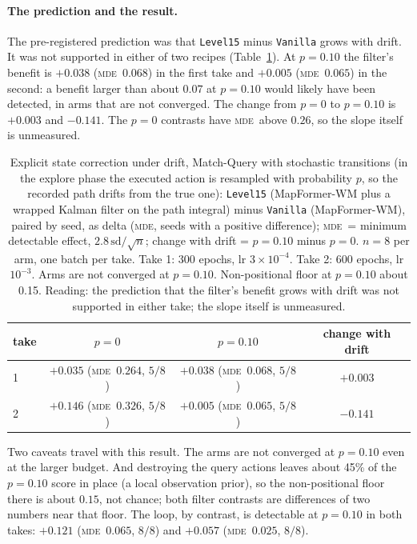 \documentclass[10pt]{article}
\newcommand{\mde}{\textsc{mde}}
\newcommand{\arm}[1]{\texttt{#1}}
\begin{document}
\paragraph{The prediction and the result.} The pre-registered prediction was that \arm{Level15} minus
\arm{Vanilla} grows with drift. It was not supported in either of two recipes (Table~\ref{tab:mqnoise}). At $p=0.10$
the filter's benefit is $+0.038$ (\mde\ $0.068$) in the first take and $+0.005$ (\mde\ $0.065$) in the second:
a benefit larger than about $0.07$ at $p=0.10$ would likely have been detected, in arms that are not
converged. The change from $p=0$ to $p=0.10$ is $+0.003$
and $-0.141$. The $p=0$ contrasts have \mde\ above $0.26$, so the slope itself is unmeasured.

\begin{table}[t]
\centering
\small
\captionsetup{font=footnotesize,skip=4pt}
\caption{Explicit state correction under drift, Match-Query with stochastic transitions (in the explore phase the executed action is resampled with probability $p$, so the recorded path drifts from the true one): \arm{Level15} (MapFormer-WM plus a wrapped Kalman filter on the path integral) minus \arm{Vanilla} (MapFormer-WM), paired by seed, as delta (\mde, seeds with a positive difference); \mde\ = minimum detectable effect, $2.8\,\mathrm{sd}/\sqrt{n}$; change with drift = $p=0.10$ minus $p=0$. $n=8$ per arm, one batch per take. Take 1: 300 epochs, lr $3\times10^{-4}$. Take 2: 600 epochs, lr $10^{-3}$. Arms are not converged at $p=0.10$. Non-positional floor at $p=0.10$ about 0.15. Reading: the prediction that the filter's benefit grows with drift was not supported in either take; the slope itself is unmeasured.}
\label{tab:mqnoise}
\begin{tabular}{@{}lccc@{}}
\toprule
take & $p=0$ & $p=0.10$ & change with drift \\
\midrule
1 & $+0.035$ (\mde\ $0.264$, $5/8$) & $+0.038$ (\mde\ $0.068$, $5/8$) & $+0.003$ \\
2 & $+0.146$ (\mde\ $0.326$, $5/8$) & $+0.005$ (\mde\ $0.065$, $5/8$) & $-0.141$ \\
\bottomrule
\end{tabular}
\end{table}

Two caveats travel with this result. The arms are not converged at $p=0.10$ even at the larger budget. And
destroying the query actions leaves about 45\% of the $p=0.10$ score in place (a local observation prior),
so the non-positional floor there is about $0.15$, not chance; both filter contrasts are differences of two
numbers near that floor. The loop, by contrast, is detectable at $p=0.10$ in both takes: $+0.121$ (\mde\
$0.065$, $8/8$) and $+0.057$ (\mde\ $0.025$, $8/8$). %
\end{document}
